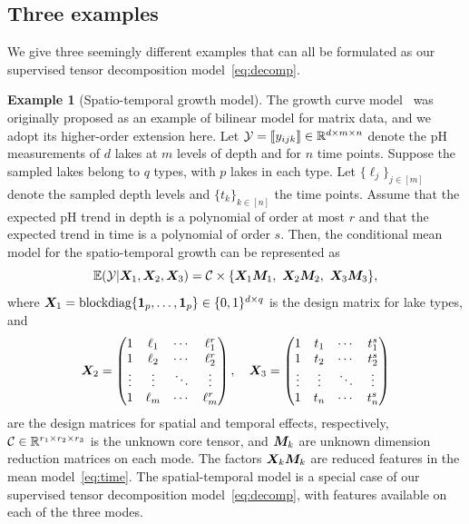 \documentclass[12pt]{article}
\theoremstyle{definition}
\theoremstyle{definition}
\newtheorem{example}{Example}
\begin{document}
\subsection{Three examples}\label{sec:motivation}
We give three seemingly different examples that can all be formulated as our supervised tensor decomposition model~\eqref{eq:decomp}.
\begin{example}[Spatio-temporal growth model]
The growth curve model~\citep{gabriel1998generalised,srivastava2008models} was originally proposed as an example of bilinear model for matrix data, and we adopt its higher-order extension here. Let $\mathcal{Y}=\llbracket y_{ijk} \rrbracket\in\mathbb{R}^{d \times m\times n}$ denote the pH measurements of $d$ lakes at $m$ levels of depth and for $n$ time points. Suppose the sampled lakes belong to $q$ types, with $p$ lakes in each type. Let $\{\ell_j\}_{j\in[m]}$ denote the sampled depth levels and $\{t_k\}_{k\in[n]}$ the time points. Assume that the expected pH trend in depth is a polynomial of order at most $r$ and that the expected trend in time is a polynomial of order $s$. Then, the conditional mean model for the spatio-temporal growth can be represented as
\begin{equation}\label{eq:time}
\mathbb{E}(\tY|\mX_1,\mX_2,\mX_3)=\tC\times\{\mX_1\mM_1,\ \mX_2\mM_2,\ \mX_3\mM_3\},
\end{equation}
where $\bm X_1=\text{blockdiag}\{\mathbf{1}_p,\ldots,\mathbf{1}_p\}\in \{0,1\}^{d\times q}$ is the design matrix for lake types, and
\[
\bm X_2=
\begin{pmatrix}
1 & \ell_1&\cdots &\ell^{r}_1\\
1 & \ell_2&\cdots &\ell^{r}_2\\
\vdots &\vdots&\ddots&\vdots\\
1&\ell_{m}&\cdots&\ell^{r}_{m}
\end{pmatrix},\quad
\bm X_3=
\begin{pmatrix}
1 & t_1&\cdots &t^{s}_1\\
1 & t_2&\cdots &t^{s}_2\\
\vdots &\vdots&\ddots&\vdots\\
1&t_{n}&\cdots&t^{s}_{n}
\end{pmatrix}
\]
are the design matrices for spatial and temporal effects, respectively, $\mathcal{C}\in\mathbb{R}^{r_1\times r_2\times r_3}$ is the unknown core tensor, and $\bm M_k$ are unknown dimension reduction matrices on each mode. The factors $\bm X_k\bm M_k$ are reduced features in the mean model~\eqref{eq:time}. The spatial-temporal model is a special case of our supervised tensor decomposition model~\eqref{eq:decomp}, with features available on each of the three modes.
\end{example}
\end{document}
